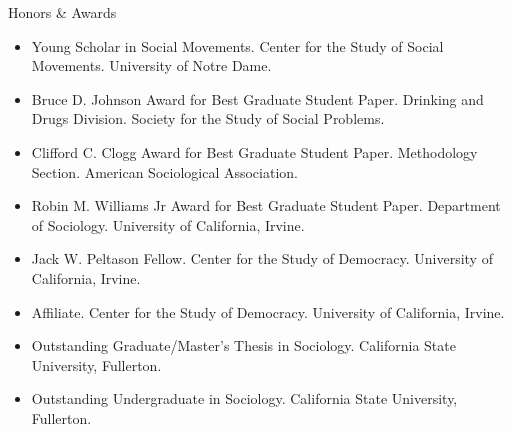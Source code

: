 \documentclass{resume} %
\newenvironment{hangt}[1]
 {\par\vspace{-\parsep}%
  \begin{itemize}[label={#1\ \quad},leftmargin=*,labelsep=0pt]
  \raggedright
  \item\relax
  \vspace*{8pt}
  }
 {\end{itemize}}
\newcommand{\datefill}{\quad \hspace{12pt}}
\begin{document}

\begin{rSection}{Honors \& Awards}

\begin{hangt}{2017 \datefill}
Young Scholar in Social Movements. Center for the Study of Social Movements. University of Notre Dame.
\end{hangt}
\begin{hangt}{2016 \datefill}
Bruce D. Johnson Award for Best Graduate Student Paper. Drinking and Drugs Division. Society for the Study of Social Problems.
\end{hangt}
\begin{hangt}{2016 \datefill}
Clifford C. Clogg Award for Best Graduate Student Paper. Methodology Section. American Sociological Association.
\end{hangt}
\begin{hangt}{2015 \datefill}
Robin M. Williams Jr Award for Best Graduate Student Paper. Department of Sociology. University of California, Irvine.
\end{hangt}
\begin{hangt}{2013 \datefill}
Jack W. Peltason Fellow. Center for the Study of Democracy. University of California, Irvine.
\end{hangt}
\begin{hangt}{2012 \datefill}
Affiliate. Center for the Study of Democracy. University of California, Irvine.
\end{hangt}
\begin{hangt}{2012 \datefill}
Outstanding Graduate/Master's Thesis in Sociology. California State University, Fullerton.
\end{hangt}
\begin{hangt}{2010 \datefill}
Outstanding Undergraduate in Sociology. California State University, Fullerton.
\end{hangt}

\end{rSection}




\end{document}
